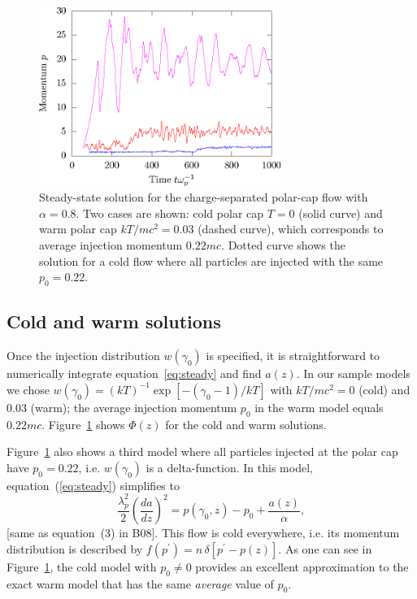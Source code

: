 \begin{figure}[h]
\begin{center}
  \includegraphics[width=0.7\textwidth]{pics/chap2/f1.eps}
  \caption[Steady-state solution for $\alpha < 0$]{Steady-state solution for the
    charge-separated polar-cap flow with $\alpha=0.8$. Two cases are shown: cold
    polar cap $T=0$ (solid curve) and warm polar cap $kT/mc^2=0.03$ (dashed
    curve), which corresponds to average injection momentum $0.22mc$. Dotted
    curve shows the solution for a cold flow where all particles are injected
    with the same $p_0=0.22$. }
\label{fig:steady}
\end{center}
\end{figure}


\subsection{Cold and warm solutions}\label{sec:solutions}

Once the injection distribution $w(\gamma_0)$ is specified,
it is straightforward to numerically integrate equation~\eqref{eq:steady} and find $a(z)$.
In our sample models we chose
$w(\gamma_0)=(kT)^{-1}\exp[-(\gamma_0-1)/kT]$ with $kT/mc^2=0$ (cold) and
0.03 (warm); the average injection momentum $p_0$ in the warm model equals
$0.22mc$. Figure~\ref{fig:steady} shows $\Phi(z)$ for the cold and warm solutions.

Figure~\ref{fig:steady} also shows a third model where all particles injected at the polar cap
have $p_0=0.22$, i.e. $w(\gamma_0)$ is a delta-function.
In this model, equation~(\ref{eq:steady}) simplifies to
\begin{equation}
\label{eq:cold}
    \frac{\lambda_p^2}{2}\left(\frac{da}{dz}\right)^2 = p(\gamma_0,z)-p_0
                                                                               + \frac{a(z)}{\alpha},
\end{equation}
[same as equation~(3) in B08]. This flow is cold everywhere, i.e. its momentum
distribution is described by $f(p^\prime)=n\,\delta[p^\prime-p(z)]$.
As one can see in Figure~\ref{fig:steady}, the cold model with $p_0\neq 0$ provides an
excellent approximation to the exact warm model that has the same {\it average}
value of $p_0$.

